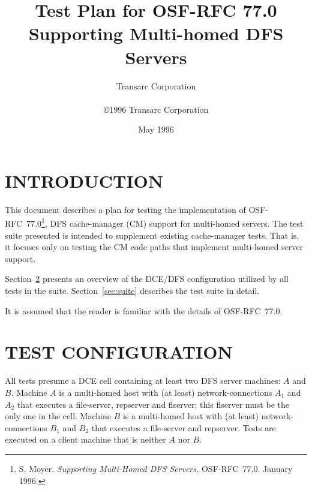 



\title{Test Plan for OSF-RFC 77.0\\
Supporting Multi-homed DFS Servers}

\author{Transarc Corporation\\
\\
\copyright 1996 Transarc Corporation}
\date{May 1996}

\maketitle

%
%

\section{INTRODUCTION}

This document describes a plan for testing the implementation
of OSF-RFC~77.0\footnote{S. Moyer. {\em Supporting Multi-Homed DFS Servers.}
OSF-RFC~77.0.  January 1996.}, DFS cache-manager (CM) support for
multi-homed servers.
The test suite presented is intended to supplement existing
cache-manager tests.  That is, it focuses only on testing the CM
code paths that implement multi-homed server support.

Section~\ref{sec:config} presents an overview of the DCE/DFS configuration
utilized by all tests in the suite.
Section~\ref{sec:suite} describes the test suite in detail.

It is assumed that the reader is familiar with the details of OSF-RFC~77.0.

%
%

\section{TEST CONFIGURATION}
\label{sec:config}

All tests presume a DCE cell containing at least two DFS server
machines: $A$ and $B$.
Machine $A$ is a multi-homed host with (at least)
network-connections $A_{1}$ and $A_{2}$ that executes a file-server,
repserver and flserver; this flserver must be the only one in the cell.
Machine $B$ is a multi-homed host with (at least)
network-connections
$B_{1}$ and $B_{2}$ that executes a file-server and repserver.
Tests are executed on a client machine that is neither $A$ nor $B$.

